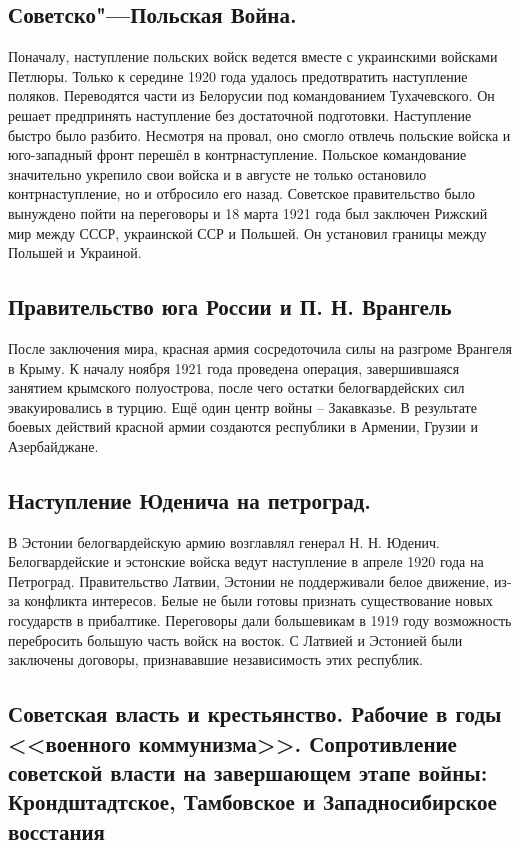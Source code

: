 \subsection{Советско"---Польская Война.}

Поначалу, наступление польских войск ведется вместе с украинскими войсками Петлюры. Только к середине 1920 года удалось предотвратить наступление поляков. Переводятся части из Белорусии под командованием Тухачевского. Он решает предпринять наступление без достаточной подготовки. Наступление быстро было разбито. Несмотря на провал, оно смогло отвлечь польские войска и юго-западный фронт перешёл в контрнаступление. 
Польское командование значительно укрепило свои войска и в августе не только остановило контрнаступление, но и отбросило его назад. Советское правительство было вынуждено пойти на переговоры и 18 марта 1921 года был заключен Рижский мир между СССР, украинской ССР и Польшей. Он установил границы между Польшей и Украиной.

\subsection{Правительство юга России и П. Н. Врангель}

После заключения мира, красная армия сосредоточила силы на разгроме Врангеля в Крыму. К началу ноября 1921 года проведена операция, завершившаяся занятием крымского полуострова, после чего остатки белогвардейских сил эвакуировались в турцию.
Ещё один центр войны – Закавказье. В результате боевых действий красной армии создаются республики в Армении, Грузии и Азербайджане.

\subsection{Наступление Юденича на петроград.}

В Эстонии белогвардейскую армию возглавлял генерал Н. Н. Юденич.
Белогвардейские и эстонские войска ведут наступление в апреле 1920 года на Петроград.
Правительство Латвии, Эстонии не поддерживали белое движение, из-за конфликта интересов. Белые не были готовы признать существование новых государств в прибалтике. Переговоры дали  большевикам в 1919 году возможность перебросить большую часть войск на восток. С Латвией и Эстонией были заключены договоры, признававшие независимость этих республик.

\subsection{Советская власть и крестьянство. Рабочие в годы <<военного коммунизма>>. Сопротивление советской власти на завершающем этапе войны: Крондштадтское, Тамбовское и Западносибирское восстания}

